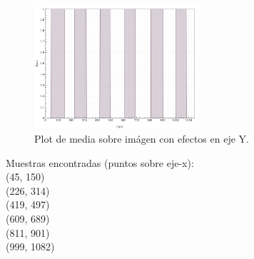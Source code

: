 \begin{itemize}
\begin{figure}[H]
	  \includegraphics[width=230px]{imagenes-jtlc/experimento/search-samples/plot-y}
	  \centering
	  \vspace{-0.4cm}
	  \caption{Plot de media sobre im\'agen con efectos en eje Y.}
	  \label{fig:font-c-plot-y}
	  \vspace{-0.15cm}
	\end{figure}
	Muestras encontradas (puntos sobre eje-x):\\
	(45, 150)\\
	(226, 314)\\
	(419, 497)\\
	(609, 689)\\
	(811, 901)\\
	(999, 1082)\\
	

\end{itemize}
